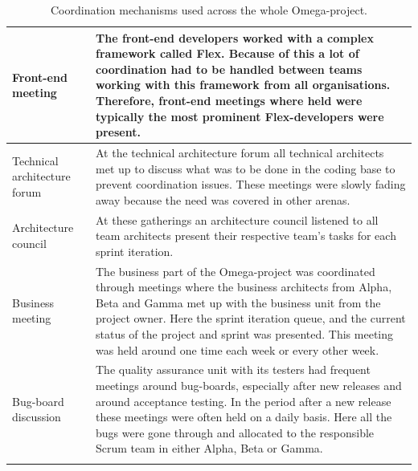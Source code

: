 \begin{center}
\begin{longtable}{| p{6cm} | p{9cm} |}
    Front-end meeting & The front-end developers worked with a complex framework called Flex. Because of this a lot of coordination had to be handled between teams working with this framework from all organisations. Therefore, front-end meetings where held were typically the most prominent Flex-developers were present. \\ \hline
    Technical architecture forum & At the technical architecture forum all technical architects met up to discuss what was to be done in the coding base to prevent coordination issues. These meetings were slowly fading away because the need was covered in other arenas. \\ \hline
    Architecture council & At these gatherings an architecture council listened to all team architects present their respective team's tasks for each sprint iteration. \\ \hline
    Business meeting & The business part of the Omega-project was coordinated through meetings where the business architects from Alpha, Beta and Gamma met up with the business unit from the project owner. Here the sprint iteration queue, and the current status of the project and sprint was presented. This meeting was held around one time each week or every other week. \\ \hline
    Bug-board discussion & The quality assurance unit with its testers had frequent meetings around bug-boards, especially after new releases and around acceptance testing. In the period after a new release these meetings were often held on a daily basis. Here all the bugs were gone through and allocated to the responsible Scrum team in either Alpha, Beta or Gamma. \\ \hline
    
    \caption{Coordination mechanisms used across the whole Omega-project.}
    \label{cmuatwo} 
    \end{longtable}
\end{center}

